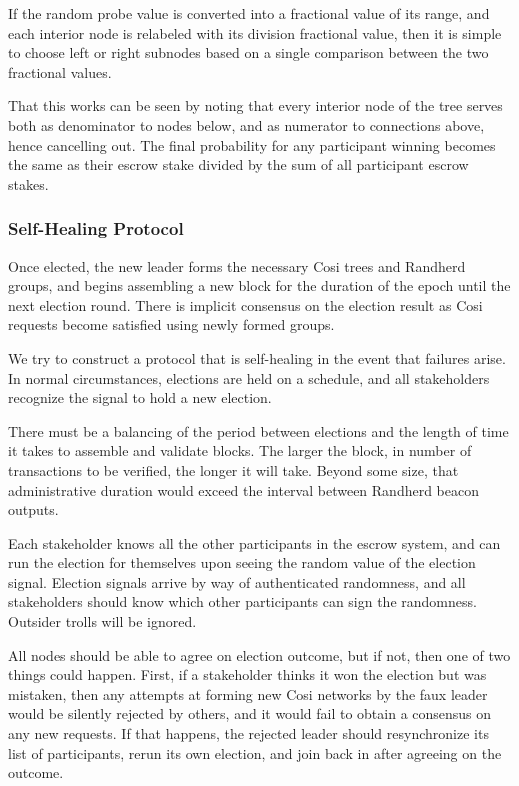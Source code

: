 \documentclass{yellowpaper}
\begin{document}
If the random probe value is converted into a fractional value of its range, and each interior node is relabeled with its division fractional value, then it is simple to choose left or right subnodes based on a single comparison between the two fractional values.

That this works can be seen by noting that every interior node of the tree serves both as denominator to nodes below, and as numerator to connections above, hence cancelling out. The final probability for any participant winning becomes the same as their escrow stake divided by the sum of all participant escrow stakes.

\subsubsection{Self-Healing Protocol}
Once elected, the new leader forms the necessary Cosi trees and Randherd groups, and begins assembling a new block for the duration of the epoch until the next election round. There is implicit consensus on the election result as Cosi requests become satisfied using newly formed groups.

We try to construct a protocol that is self-healing in the event that failures arise. In normal circumstances, elections are held on a schedule, and all stakeholders recognize the signal to hold a new election. 

There must be a balancing of the period between elections and the length of time it takes to assemble and validate blocks. The larger the block, in number of transactions to be verified, the longer it will take. Beyond some size, that administrative duration would exceed the interval between Randherd beacon outputs.

Each stakeholder knows all the other participants in the escrow system, and can run the election for themselves upon seeing the random value of the election signal. Election signals arrive by way of authenticated randomness, and all stakeholders should know which other participants can sign the randomness. Outsider trolls will be ignored.

All nodes should be able to agree on election outcome, but if not, then one of two things could happen. First, if a stakeholder thinks it won the election but was mistaken, then any attempts at forming new Cosi networks by the faux leader would be silently rejected by others, and it would fail to obtain a consensus on any new requests. If that happens, the rejected leader should resynchronize its list of participants, rerun its own election, and join back in after agreeing on the outcome. 
\end{document}
